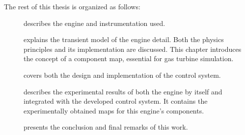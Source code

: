 \documentclass[tcc]{subfiles}
\begin{document}
The rest of this thesis is organized as follows: 
\begin{description}
    \item[] describes the engine and instrumentation used.
    \item[] explains the transient model of the engine detail.
        Both the physics principles and its implementation are discussed. 
        This chapter introduces the concept of a component map, 
         essential for gas turbine simulation.
    \item[] covers both the design and implementation of the control system.
    \item[] describes the experimental results of both the engine by itself 
         and integrated with the developed control system. 
        It contains the experimentally obtained maps for this engine's components.
    \item[] presents the conclusion and final remarks of this work.
\end{description}
\end{document}
